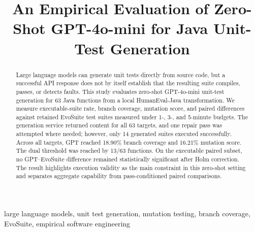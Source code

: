 \documentclass[conference]{IEEEtran}
\begin{document}
\title{An Empirical Evaluation of Zero-Shot GPT-4o-mini for Java Unit-Test Generation}

\author{
}

\maketitle

\begin{abstract}
Large language models can generate unit tests directly from source code, but a successful API response does not by itself establish that the resulting suite compiles, passes, or detects faults. This study evaluates zero-shot GPT-4o-mini unit-test generation for 63 Java functions from a local HumanEval-Java transformation. We measure executable-suite rate, branch coverage, mutation score, and paired differences against retained EvoSuite test suites measured under 1-, 3-, and 5-minute budgets. The generation service returned content for all 63 targets, and one repair pass was attempted where needed; however, only 14 generated suites executed successfully. Across all targets, GPT reached 18.90\% branch coverage and 16.21\% mutation score. The dual threshold was reached by 13/63 functions. On the executable paired subset, no GPT--EvoSuite difference remained statistically significant after Holm correction. The result highlights execution validity as the main constraint in this zero-shot setting and separates aggregate capability from pass-conditioned paired comparisons.
\end{abstract}

\begin{IEEEkeywords}
large language models, unit test generation, mutation testing, branch coverage, EvoSuite, empirical software engineering
\end{IEEEkeywords}











\end{document}
